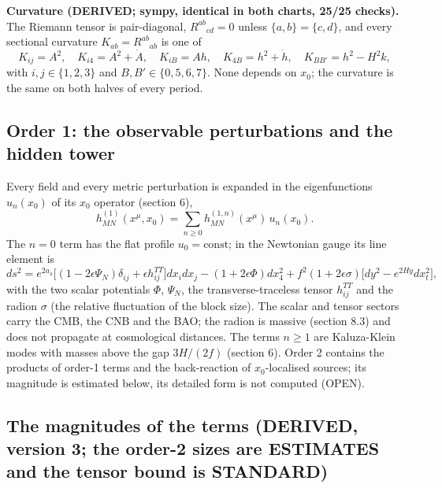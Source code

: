 \documentclass[
  10pt,
]{article}
\begin{document}
\textbf{Curvature (DERIVED; sympy, identical in both charts, 25/25
checks).} The Riemann tensor is pair-diagonal, \(R^{ab}{}_{cd} = 0\)
unless \(\{a,b\} = \{c,d\}\), and every sectional curvature
\(K_{ab} = R^{ab}{}_{ab}\) is one of
\[ K_{ij} = A^2,\quad K_{i4} = A^2 + \dot A,\quad K_{iB} = A h,\quad K_{4B} = h^2 + \dot h,\quad K_{BB'} = h^2 - H^2 k, \]
with \(i, j \in \{1,2,3\}\) and \(B, B' \in \{0,5,6,7\}\). None depends
on \(x_0\); the curvature is the same on both halves of every period.

\hypertarget{order-1-the-observable-perturbations-and-the-hidden-tower}{%
\subsection{Order 1: the observable perturbations and the hidden
tower}\label{order-1-the-observable-perturbations-and-the-hidden-tower}}

Every field and every metric perturbation is expanded in the
eigenfunctions \(u_n(x_0)\) of its \(x_0\) operator (section 6),
\[ h^{(1)}_{MN}(x^\mu, x_0) = \sum_{n \ge 0} h^{(1,n)}_{MN}(x^\mu)\, u_n(x_0). \]
The \(n = 0\) term has the flat profile \(u_0 = \text{const}\); in the
Newtonian gauge its line element is
\[ ds^2 = e^{2a_4}\big[(1 - 2\epsilon\Psi_N)\delta_{ij} + \epsilon h^{TT}_{ij}\big]dx_i dx_j - (1 + 2\epsilon\Phi)dx_4^2
   + f^2(1 + 2\epsilon\sigma)\big[dy^2 - e^{2Hy}dx_t^2\big], \] with the
two scalar potentials \(\Phi\), \(\Psi_N\), the transverse-traceless
tensor \(h^{TT}_{ij}\) and the radion \(\sigma\) (the relative
fluctuation of the block size). The scalar and tensor sectors carry the
CMB, the CNB and the BAO; the radion is massive (section 8.3) and does
not propagate at cosmological distances. The terms \(n \ge 1\) are
Kaluza-Klein modes with masses above the gap \(3H/(2f)\) (section 6).
Order 2 contains the products of order-1 terms and the back-reaction of
\(x_0\)-localised sources; its magnitude is estimated below, its
detailed form is not computed (OPEN).

\hypertarget{the-magnitudes-of-the-terms-derived-version-3-the-order-2-sizes-are-estimates-and-the-tensor-bound-is-standard}{%
\subsection{The magnitudes of the terms (DERIVED, version 3; the order-2
sizes are ESTIMATES and the tensor bound is
STANDARD)}\label{the-magnitudes-of-the-terms-derived-version-3-the-order-2-sizes-are-estimates-and-the-tensor-bound-is-standard}}
\end{document}

